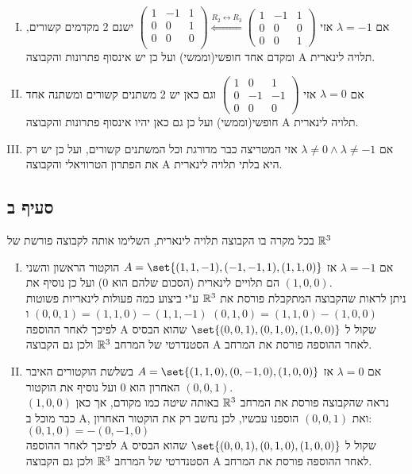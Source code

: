 \documentclass{article}
\DeclarePairedDelimiter\set\{\}
\begin{document}
\begin{enumerate}[(I)]
	\item אם $\lambda = -1$ אזי
	$
		\begin{pmatrix}
			1 & -1 & 1 \\
			0 & 0 & 1 \\
			0 & 0 & 0 \\
		\end{pmatrix}
		\overset{R_2 \leftrightarrow R_3}{\Longleftarrow}
		\begin{pmatrix}
			1 & -1 & 1 \\
			0 & 0 & 0 \\
			0 & 0 & 1
		\end{pmatrix}
	$
ישנם 2 מקדמים קשורים, ומקדם אחד חופשי(וממשי)  ועל כן יש אינסוף פתרונות והקבוצה A תלויה לינארית.
	\item אם $\lambda = 0$ אזי
	$\begin{pmatrix}
		1 & 0 & 1 \\
		0 & -1 & -1 \\
		0 & 0 & 0
	\end{pmatrix}$
	וגם כאן יש 2 משתנים קשורים ומשתנה אחד חופשי(וממשי) ועל כן גם כאן יהיו אינסוף פתרונות והקבוצה A תלויה לינארית.

	\item אם $\lambda \neq 0 \land \lambda \neq -1$ אזי המטריצה כבר מדורגת וכל המשתנים קשורים, ועל כן יש רק את הפתרון הטרוויאלי והקבוצה A היא בלתי תלויה לינארית.
\end{enumerate}

\subsection*{סעיף ב}
בכל מקרה בו הקבוצה תלויה לינארית, השלימו אותה לקבוצה פורשת של $\mathbb{R}^3$

\begin{enumerate}[(I)]
	\item אם $\lambda = -1$ אז $A = \set{(1,1, -1), (-1, -1, 1), (1, 1, 0)}$
	 הוקטור הראשון והשני הם תלויים לינארית (הסכום שלהם הוא 0) ועל כן נוסיף את $(1,0,0)$. \\
	ניתן לראות שהקבוצה המתקבלת פורסת את $\mathbb{R}^3$ ע"י ביצוע כמה פעולות לינאריות פשוטות $(0,0,1)=(1,1,0) - (1,1,-1)$ ו $(0,1,0) = (1,1,0)-(1,0,0)$ \\
לפיכך לאחר ההוספה A שקול ל $\set{(0,0,1), (0,1,0), (1,0,0)}$ שהוא הבסיס הסטנדרטי של המרחב $\mathbb{R}^3$ ולכן גם הקבוצה A לאחר ההוספה פורסת את המרחב.

\item אם $\lambda = 0$ אז $A = \set{(1,1, 0), (0, -1, 0), (1, 0, 0)}$
בשלשת הוקטורים האיבר האחרון הוא 0 ועל נוסיף את הוקטור $(0,0,1)$. \\
נראה שהקבוצה פורסת את המרחב $\mathbb{R}^3$
באותה שיטה כמו מקודם, אך כאן $(1,0,0)$ כבר מוכל ב A, ואת $(0,0,1)$ הוספנו עכשיו, לכן נחשב רק את הוקטור האחרון:
 $(0, 1, 0)=-(0, -1, 0)$ \\
לפיכך לאחר ההוספה A שקול ל $\set{(0,0,1), (0,1,0), (1,0,0)}$ שהוא הבסיס הסטנדרטי של המרחב $\mathbb{R}^3$ ולכן גם הקבוצה A לאחר ההוספה פורסת את המרחב.
\end{enumerate}
\end{document}

